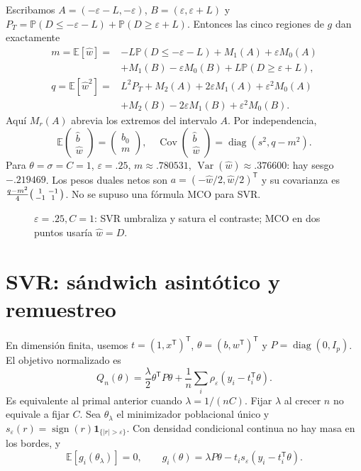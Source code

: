 \documentclass[11pt,a4paper]{article}
\newcommand{\E}{\mathbb E}
\newcommand{\Prob}{\mathbb P}
\newcommand{\T}{^{\mathsf T}}
\newcommand{\ind}{\mathbf 1}
\newcommand{\abs}[1]{\left\lvert #1\right\rvert}
\DeclareMathOperator{\Var}{Var}
\DeclareMathOperator{\Cov}{Cov}
\DeclareMathOperator{\diag}{diag}
\DeclareMathOperator{\sign}{sign}
\newcommand{\topic}[2]{\clearpage\section{#1}\label{#2}}
\theoremstyle{definition}\newtheorem{definicion}[teorema]{Definición}
\begin{document}
Escribamos $A=(-\varepsilon-L,-\varepsilon)$,
$B=(\varepsilon,\varepsilon+L)$ y
$P_T=\Prob(D\le-\varepsilon-L)+\Prob(D\ge\varepsilon+L)$.
Entonces las cinco regiones de $g$ dan exactamente
\[
\begin{aligned}
m=\E[\widehat w]={}&-L\Prob(D\le-\varepsilon-L)
+M_1(A)+\varepsilon M_0(A)\\
&+M_1(B)-\varepsilon M_0(B)+L\Prob(D\ge\varepsilon+L),\\
q=\E[\widehat w^2]={}&L^2P_T+M_2(A)+2\varepsilon M_1(A)+\varepsilon^2M_0(A)\\
&+M_2(B)-2\varepsilon M_1(B)+\varepsilon^2M_0(B).
\end{aligned}
\]
Aquí $M_r(A)$ abrevia los extremos del intervalo $A$. Por independencia,
\[
\boxed{\E\begin{pmatrix}\widehat b\\\widehat w\end{pmatrix}
=\begin{pmatrix}b_0\\m\end{pmatrix},\quad
\Cov\begin{pmatrix}\widehat b\\\widehat w\end{pmatrix}
=\diag(s^2,q-m^2)}.
\]
Para $\theta=\sigma=C=1$, $\varepsilon=.25$,
$m\approx.780531$, $\Var(\widehat w)\approx.376600$:
hay sesgo $-.219469$. Los pesos duales netos son
$a=(-\widehat w/2,\widehat w/2)\T$ y su covarianza es
$\frac{q-m^2}{4}\begin{psmallmatrix}1&-1\\-1&1\end{psmallmatrix}$.
No se supuso una fórmula MCO para SVR.


\begin{figure}[H]\centering
{}
\caption{$\varepsilon=.25,C=1$: SVR umbraliza y satura el contraste; MCO en dos puntos usaría $\widehat w=D$.}
\end{figure}
\topic{SVR: sándwich asintótico y remuestreo}{s54}
En dimensión finita, usemos $t=(1,x\T)\T$, $\theta=(b,w\T)\T$ y
$P=\diag(0,I_p)$. El objetivo normalizado es
\[
Q_n(\theta)=\frac\lambda2\theta\T P\theta+
\frac1n\sum_i\rho_\varepsilon(y_i-t_i\T\theta).
\]
Es equivalente al primal anterior cuando $\lambda=1/(nC)$.
Fijar $\lambda$ al crecer $n$ no equivale a fijar $C$.
Sea $\theta_\lambda$ el minimizador poblacional único y
$s_\varepsilon(r)=\sign(r)\ind_{\{\abs r>\varepsilon\}}$.
Con densidad condicional continua no hay masa en los bordes, y
\[
\E[g_i(\theta_\lambda)]=0,\qquad
g_i(\theta)=\lambda P\theta-t_i s_\varepsilon(y_i-t_i\T\theta).
\]
\end{document}

